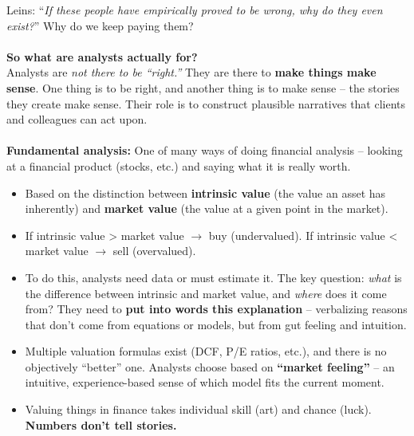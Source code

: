 \documentclass[a4paper,12pt]{article}
\begin{document}
\noindent Leins: ``\emph{If these people have empirically proved to be wrong, why do they even exist?}'' Why do we keep paying them? \\
\\
\noindent \textbf{So what are analysts actually for?} \\
\noindent Analysts are \emph{not there to be ``right.''} They are there to \textbf{make things make sense}. One thing is to be right, and another thing is to make sense -- the stories they create make sense. Their role is to construct plausible narratives that clients and colleagues can act upon. \\
\\
\noindent \textbf{Fundamental analysis:} One of many ways of doing financial analysis -- looking at a financial product (stocks, etc.) and saying what it is really worth.
\begin{itemize}
	\item Based on the distinction between \textbf{intrinsic value} (the value an asset has inherently) and \textbf{market value} (the value at a given point in the market).
	\item If intrinsic value > market value $\rightarrow$ buy (undervalued). If intrinsic value < market value $\rightarrow$ sell (overvalued).
	\item To do this, analysts need data or must estimate it. The key question: \emph{what} is the difference between intrinsic and market value, and \emph{where} does it come from? They need to \textbf{put into words this explanation} -- verbalizing reasons that don't come from equations or models, but from gut feeling and intuition.
	\item Multiple valuation formulas exist (DCF, P/E ratios, etc.), and there is no objectively ``better'' one. Analysts choose based on \textbf{``market feeling''} -- an intuitive, experience-based sense of which model fits the current moment.
	\item Valuing things in finance takes individual skill (art) and chance (luck). \textbf{Numbers don't tell stories.}
\end{itemize}
\end{document}
